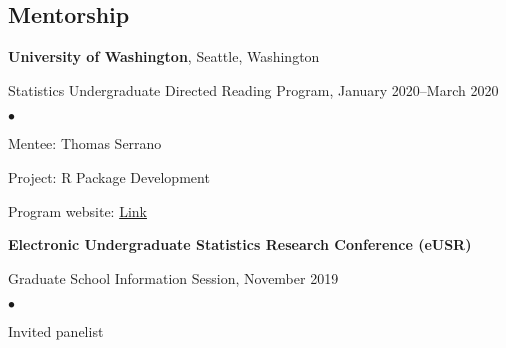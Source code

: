 \documentclass[margin,centered]{res}
\newenvironment{list1}{
  \begin{list}{\ding{113}}{%
      \setlength{\itemsep}{0in}
      \setlength{\parsep}{0in} \setlength{\parskip}{0in}
      \setlength{\topsep}{0in} \setlength{\partopsep}{0in}
      \setlength{\leftmargin}{0.17in}}}{\end{list}}
\newenvironment{list2}{
  \begin{list}{$\bullet$}{%
      \setlength{\itemsep}{0in}
      \setlength{\parsep}{0in} \setlength{\parskip}{0in}
      \setlength{\topsep}{0in} \setlength{\partopsep}{0in}
      \setlength{\leftmargin}{0.2in}}}{\end{list}}
\begin{document}
\begin{resume}
\section{\sc Mentorship}

{\bf University of Washington}, Seattle, Washington
\begin{list1}
\item[] Statistics Undergraduate Directed Reading Program, January 2020--March 2020
\begin{list2}
\vspace*{.05in}
\item Mentee: Thomas Serrano
\item Project: R Package Development
\item Program website: \href{https://spa-drp.github.io}{Link}
\end{list2}
\end{list1}

{\bf Electronic Undergraduate Statistics Research Conference (eUSR)}
\begin{list1}
\item[] Graduate School Information Session, November 2019
\begin{list2}
\vspace*{.05in}
\item Invited panelist
\end{list2}
\end{list1}








\newpage


\end{resume}
\end{document}
